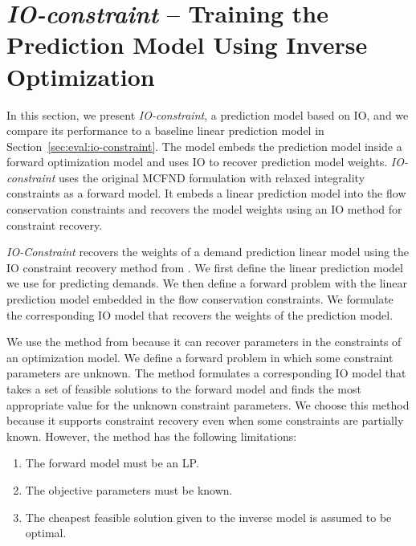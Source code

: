 
\section{\textit{IO-constraint} -- Training the Prediction Model Using Inverse Optimization} \label{sec:methodology:training-the-models}

In this section, we present \textit{IO-constraint}, a prediction model based on IO, and we compare its performance to a baseline linear prediction model in Section~\ref{sec:eval:io-constraint}. The model embeds the prediction model inside a forward optimization model and uses IO to recover prediction model weights. \textit{IO-constraint} uses the original MCFND formulation with relaxed integrality constraints as a forward model. It embeds a linear prediction model into the flow conservation constraints and recovers the model weights using an IO method for constraint recovery. 


\textit{IO-Constraint} recovers the weights of a demand prediction linear model using the IO constraint recovery method from \cite{ghobadiInferringLinearFeasible2021}. We first define the linear prediction model we use for predicting demands. We then define a forward problem with the linear prediction model embedded in the flow conservation constraints. We formulate the corresponding IO model that recovers the weights of the prediction model. 

We use the method from \cite{ghobadiInferringLinearFeasible2021} because it can recover parameters in the constraints of an optimization model. We define a forward problem in which some constraint parameters are unknown. The method formulates a corresponding IO model that takes a set of feasible solutions to the forward model and finds the most appropriate value for the unknown constraint parameters. We choose this method because it supports constraint recovery even when some constraints are partially known. However, the method has the following limitations:
\begin{enumerate}
    \item The forward model must be an LP.
    \item The objective parameters must be known.
    \item The cheapest feasible solution given to the inverse model is assumed to be optimal.
\end{enumerate}

